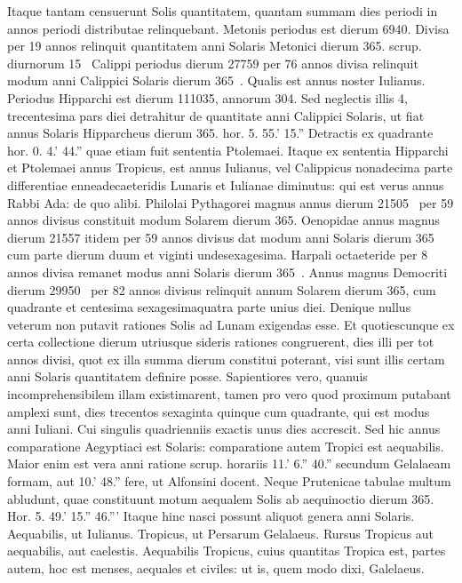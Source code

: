 Itaque tantam
censuerunt Solis quantitatem, quantam summam dies periodi in annos
periodi distributae relinquebant.
Metonis periodus est dierum
6940.
Divisa per 19 annos relinquit quantitatem anni Solaris Metonici
dierum 365. scrup. diurnorum 15~ Calippi periodus dierum
27759 per 76 annos divisa relinquit modum anni Calippici Solaris
dierum 365~.
Qualis est annus noster Iulianus.
Periodus Hipparchi
est dierum 111035, annorum 304.
Sed neglectis illis 4,
trecentesima pars diei detrahitur de quantitate anni Calippici Solaris,
ut fiat annus Solaris Hipparcheus
 dierum 365. hor. 5. 55.' 15.'' 
Detractis ex quadrante hor. 0. 4.' 44.'' 
 quae etiam fuit sententia
Ptolemaei.
Itaque ex sententia Hipparchi et Ptolemaei annus
Tropicus, est annus Iulianus, vel Calippicus nonadecima parte
differentiae enneadecaeteridis Lunaris et Iulianae diminutus: qui
est verus annus Rabbi Ada: de quo alibi.
Philolai Pythagorei magnus
annus dierum 21505~ per 59 annos divisus constituit modum
Solarem dierum 365.
Oenopidae annus magnus dierum 21557
itidem per 59 annos divisus dat modum anni Solaris dierum 365 cum
parte dierum duum et viginti undesexagesima.
Harpali octaeteride per
8 annos divisa remanet modus anni Solaris dierum 365~.
Annus magnus
Democriti dierum 29950~ per 82 annos divisus relinquit annum
Solarem dierum 365, cum quadrante et centesima sexagesimaquatra
parte unius diei.
Denique nullus veterum non putavit rationes
Solis ad Lunam exigendas esse.
Et quotiescunque ex certa collectione
dierum utriusque sideris rationes congruerent, dies illi per tot
annos divisi, quot ex illa summa dierum constitui poterant, visi sunt
illis certam anni Solaris quantitatem definire posse.
Sapientiores vero,
quanuis incomprehensibilem illam existimarent, tamen pro vero quod
proximum putabant amplexi sunt, dies trecentos sexaginta quinque
cum quadrante, qui est modus anni Iuliani.
Cui singulis quadrienniis
exactis unus dies accrescit.
Sed hic annus comparatione Aegyptiaci
est Solaris: comparatione autem Tropici est aequabilis.
Maior
enim est vera anni ratione scrup. horariis 11.' 6.'' 40.'' secundum
Gelalaeam formam, aut 10.' 48.'' fere, ut Alfonsini docent.
Neque
Prutenicae tabulae multum abludunt, quae constituunt motum
aequalem Solis ab aequinoctio dierum 365. Hor. 5. 49.' 15.'' 46.'''
Itaque hinc nasci possunt aliquot genera anni Solaris.
Aequabilis,
ut Iulianus.
Tropicus, ut Persarum Gelalaeus.
Rursus Tropicus
aut aequabilis, aut caelestis.
Aequabilis
Tropicus, cuius quantitas
Tropica est, partes autem, hoc est menses, aequales et civiles: ut is,
quem modo dixi, Galelaeus.

